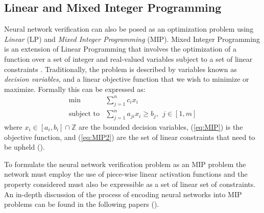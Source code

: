 \documentclass[10pt,conference]{IEEEtran}
\begin{document}
\subsection{Linear and Mixed Integer Programming}
Neural network verification can also be posed as an optimization problem using \emph{Linear} (LP) and \emph{Mixed Integer Programming} (MIP). Mixed Integer Programming is an extension of Linear Programming that involves the optimization of a function over a set of integer and real-valued variables subject to a set of linear constraints \cite{LeofanteAdvances2018}. Traditionally, the problem is described by variables known as \emph{decision variables}, and a linear objective function that we wish to minimize or maximize. Formally this can be expressed as:
\begin{align}
    \textrm{min} &\sum_{j=1}^{n}c_ix_i \label{eq:MIP}\\
    \textrm{subject to}& \sum_{j=1}^{n} a_{ji}x_i \geq b_j, \ \ j \in [1,m] \label{eq:MIP2}
\end{align}
where $x_i \in [a_i, b_i] \cap \mathbb{Z}$ are the bounded decision variables, (\ref{eq:MIP}) is the objective function, and (\ref{eq:MIP2}) are the set of linear constraints that need to be upheld (\cite{LeofanteAdvances2018,KatzLecture_2018}).

To formulate the neural network verification problem as an MIP problem the network must employ the use of piece-wise linear activation functions and the property considered must also be expressible as a set of linear set of constraints. An in-depth discussion of the process of encoding neural networks into MIP problems can be found in the following papers (\cite{BunelPiecewise2017, BastaniMeasuring2018, TjengMixedIntegerPogramming}). %
\end{document}
